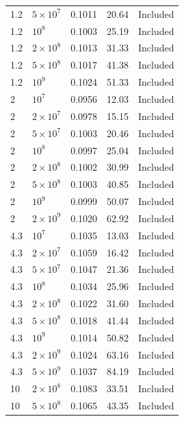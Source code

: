 \documentclass[11pt]{article}
\begin{document}
\begin{longtable}{l l r r l}
\rowcolor{included} 1.2 & $5\times10^{7}$ & 0.1011 & 20.64 & Included \\
\rowcolor{included} 1.2 & $10^{8}$ & 0.1003 & 25.19 & Included \\
\rowcolor{included} 1.2 & $2\times10^{8}$ & 0.1013 & 31.33 & Included \\
\rowcolor{included} 1.2 & $5\times10^{8}$ & 0.1017 & 41.38 & Included \\
\rowcolor{included} 1.2 & $10^{9}$ & 0.1024 & 51.33 & Included \\
\rowcolor{included} 2 & $10^{7}$ & 0.0956 & 12.03 & Included \\
\rowcolor{included} 2 & $2\times10^{7}$ & 0.0978 & 15.15 & Included \\
\rowcolor{included} 2 & $5\times10^{7}$ & 0.1003 & 20.46 & Included \\
\rowcolor{included} 2 & $10^{8}$ & 0.0997 & 25.04 & Included \\
\rowcolor{included} 2 & $2\times10^{8}$ & 0.1002 & 30.99 & Included \\
\rowcolor{included} 2 & $5\times10^{8}$ & 0.1003 & 40.85 & Included \\
\rowcolor{included} 2 & $10^{9}$ & 0.0999 & 50.07 & Included \\
\rowcolor{included} 2 & $2\times10^{9}$ & 0.1020 & 62.92 & Included \\
\rowcolor{included} 4.3 & $10^{7}$ & 0.1035 & 13.03 & Included \\
\rowcolor{included} 4.3 & $2\times10^{7}$ & 0.1059 & 16.42 & Included \\
\rowcolor{included} 4.3 & $5\times10^{7}$ & 0.1047 & 21.36 & Included \\
\rowcolor{included} 4.3 & $10^{8}$ & 0.1034 & 25.96 & Included \\
\rowcolor{included} 4.3 & $2\times10^{8}$ & 0.1022 & 31.60 & Included \\
\rowcolor{included} 4.3 & $5\times10^{8}$ & 0.1018 & 41.44 & Included \\
\rowcolor{included} 4.3 & $10^{9}$ & 0.1014 & 50.82 & Included \\
\rowcolor{included} 4.3 & $2\times10^{9}$ & 0.1024 & 63.16 & Included \\
\rowcolor{included} 4.3 & $5\times10^{9}$ & 0.1037 & 84.19 & Included \\
\rowcolor{included} 10 & $2\times10^{8}$ & 0.1083 & 33.51 & Included \\
\rowcolor{included} 10 & $5\times10^{8}$ & 0.1065 & 43.35 & Included \\

\end{longtable}
\end{document}
